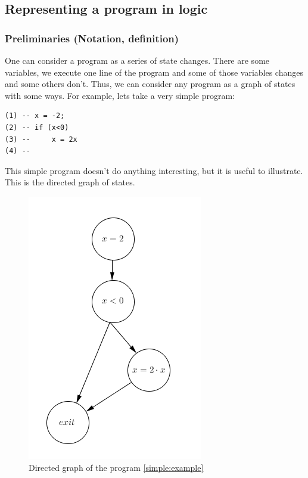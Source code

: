 \subsection{Representing a program in logic}

\subsubsection{Preliminaries (Notation, definition)}

One can consider a program as a series of state changes. There are some variables, we execute one line of the program and some of those variables changes and some others don't. Thus, we can consider any program as a graph of states with some ways. For example, lets take a very simple program:

\begin{center}
\begin{lstlisting}
(1) -- x = -2;
(2) -- if (x<0) 
(3) --     x = 2x 
(4) --
\end{lstlisting}
\label{simple:example}
\end{center}

This simple program doesn't do anything interesting, but it is useful to illustrate. This is the directed graph of states.


\begin{figure}[hbtp]
\centering
\includegraphics[scale=0.6]{graphics/simpleExample.png}
\caption{Directed graph of the program \ref{simple:example}}
\end{figure}


